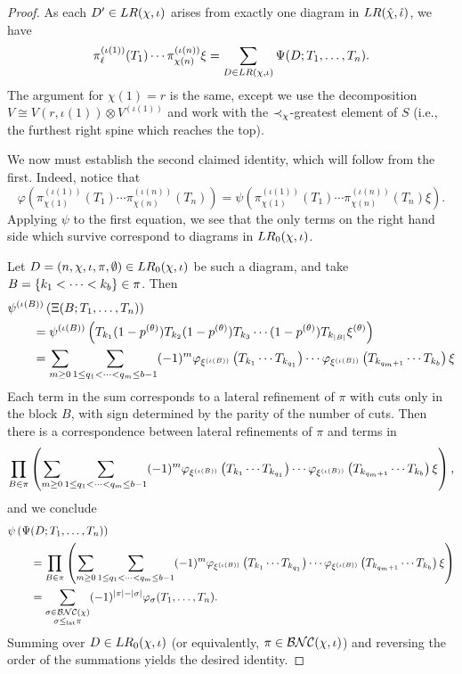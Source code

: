 \begin{proof}
	As each $D' \in LR(\chi, \iota)$ arises from exactly one diagram in $LR(\hat\chi, \hat\iota)$, we have
	$$
	\pi_{\ell}^{(\iota(1))}(T_1)\cdots \pi_{\chi(n)}^{(\iota(n))}\xi
	= \sum_{D \in LR(\chi, \iota)} \Psi(D; T_1, \ldots, T_n).
	$$
	The argument for $\chi(1) = r$ is the same, except we use the decomposition $V \cong V(r, \iota(1)) \otimes V^{(\iota(1))}$ and work with the $\prec_\chi$-greatest element of $S$ (i.e., the furthest right spine which reaches the top).

	We now must establish the second claimed identity, which will follow from the first.
	Indeed, notice that
	$$\varphi(\pi_{\chi(1)}^{(\iota(1))}(T_1)\cdots \pi_{\chi(n)}^{(\iota(n))}(T_n)) = \psi(\pi_{\chi(1)}^{(\iota(1))}(T_1)\cdots \pi_{\chi(n)}^{(\iota(n))}(T_n)\xi).$$
	Applying $\psi$ to the first equation, we see that the only terms on the right hand side which survive correspond to diagrams in $LR_0(\chi, \iota)$.

	Let $D = (n, \chi, \iota, \pi, \emptyset) \in LR_0(\chi, \iota)$ be such a diagram, and take $B = \left\{k_1 < \cdots < k_b\right\} \in \pi$.
	Then
	\begin{align*}
		&\psi^{(\iota(B))}\left(\Xi(B; T_1, \ldots, T_n)\right) \\
		&\qquad = \psi^{(\iota(B))}\left(T_{k_1}(1-p^{(\theta)})T_{k_2}(1-p^{(\theta)})T_{k_3}\cdots(1-p^{(\theta)})T_{k_{|B|}}\xi^{(\theta)}\right) \\
		&\qquad = \sum_{m\geq 0} \sum_{1\leq q_1 < \cdots < q_m \leq b-1} (-1)^m\varphi_{\xi^{(\iota(B))}}\left(T_{k_1}\cdots T_{k_{q_1}}\right)\cdots\varphi_{\xi^{(\iota(B))}}\left(T_{k_{q_m+1}}\cdots T_{k_b}\right) \xi
	\end{align*}
	Each term in the sum corresponds to a lateral refinement of $\pi$ with cuts only in the block $B$, with sign determined by the parity of the number of cuts.
	Then there is a correspondence between lateral refinements of $\pi$ and terms in
	$$\prod_{B\in\pi} \left(\sum_{m\geq 0} \sum_{1\leq q_1 < \cdots < q_m \leq b-1} (-1)^m\varphi_{\xi^{(\iota(B))}}\left(T_{k_1}\cdots T_{k_{q_1}}\right)\cdots\varphi_{\xi^{(\iota(B))}}\left(T_{k_{q_m+1}}\cdots T_{k_b}\right) \xi\right),$$
	and we conclude
	\begin{align*}
		&\psi\left(\Psi(D; T_1, \ldots, T_n)\right) \\
		&\qquad = \prod_{B\in\pi} \left(\sum_{m\geq 0} \sum_{1\leq q_1 < \cdots < q_m \leq b-1} (-1)^m\varphi_{\xi^{(\iota(B))}}\left(T_{k_1}\cdots T_{k_{q_1}}\right)\cdots\varphi_{\xi^{(\iota(B))}}\left(T_{k_{q_m+1}}\cdots T_{k_b}\right) \xi\right) \\
		&\qquad = \sum_{\substack{\sigma \in \mathcal{BNC}(\chi) \\ \sigma \leq_{{\operatorname{lat}}} \pi}} (-1)^{\left|\pi\right| - \left|\sigma\right|}\varphi_\sigma(T_1, \ldots, T_n).
	\end{align*}
	Summing over $D \in LR_0(\chi, \iota)$ (or equivalently, $\pi \in \mathcal{BNC}(\chi, \iota)$) and reversing the order of the summations yields the desired identity.
\end{proof}

